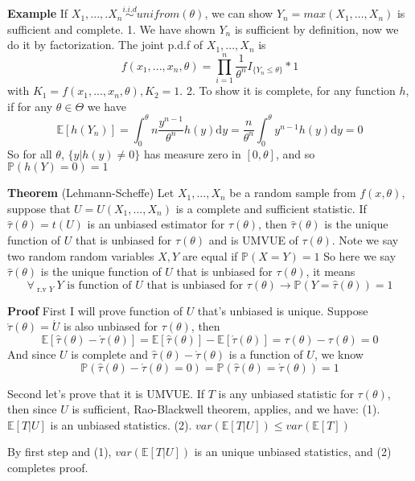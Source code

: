 \documentclass[a4paper,12pt]{article}
\begin{document}
\textbf{Example} If $X_1, ..., .X_n \overset{i.i.d}{\sim} unifrom(\theta)$, we can show $Y_n = max(X_1, ..., X_n)$ is sufficient and complete. 
1. We have shown $Y_n$ is sufficient by definition, now we do it by factorization. The joint p.d.f of $X_1, ..., X_n$ is
$$f(x_1, ..., x_n, \theta) = \prod_{i=1}^n \frac{1}{\theta^n} I_{\{Y_n \leq \theta\}} * 1$$
with $K_1 = f(x_1, ..., x_n, \theta), K_2 = 1$.
2. To show it is complete, for any function $h$, if for any $\theta\in\Theta$ we have
$$\mathbb{E}[ h(Y_n) ] = \int_0^\theta n\frac{y^{n-1}}{\theta^n}h(y) \mathrm{d}y = \frac{n}{\theta^n} \int_0^\theta y^{n-1}h(y) \mathrm{d}y = 0$$
So for all $\theta$, $\{ y | h(y) \neq 0 \}$ has measure zero in $[0, \theta]$, and so $\mathbb{P}( h(Y) = 0 ) = 1$ 

\textbf{Theorem} (Lehmann-Scheffe) Let $X_1, ..., X_n$ be a random sample from $f(x, \theta)$, suppose that $U = U(X_1, ..., X_n)$ is a complete and sufficient statistic. If $\hat{\tau}(\theta) = t(U)$ is an unbiased estimator for $\tau(\theta)$, then $\hat{\tau}(\theta)$ is the unique function of $U$ that is unbiased for $\tau(\theta)$ and is UMVUE of $\tau(\theta)$. Note we say two random random variables $X, Y$ are equal if $\mathbb{P}( X = Y ) = 1$ So here we say $\hat{\tau}(\theta)$ is the unique function of $U$ that is unbiased for $\tau(\theta)$, it means
$$\forall_{\text{ r.v } Y } \ Y \text{ is function of } U \text{ that is unbiased for } \tau(\theta) \to \mathbb{P}(Y = \hat{\tau}(\theta)) = 1$$ 

\textbf{Proof} 
First I will prove function of $U$ that's unbiased is unique. Suppose $\acute{\tau}(\theta) = \acute{U}$ is also unbiased for $\tau(\theta)$, then
$$\mathbb{E}[ \hat{\tau}(\theta) - \acute{\tau}(\theta) ] = \mathbb{E}[ \hat{\tau}(\theta) ] - \mathbb{E}[ \acute{\tau}(\theta) ] = \tau(\theta) - \tau(\theta) = 0$$
And since $U$ is complete and $\hat{\tau}(\theta) - \acute{\tau}(\theta)$ is a function of $U$, we know 
$$\mathbb{P}( \hat{\tau}(\theta) - \acute{\tau}(\theta) = 0 ) = \mathbb{P}( \hat{\tau}(\theta) = \acute{\tau}(\theta) ) = 1$$

Second let's prove that it is UMVUE. If $T$ is any unbiased statistic for $\tau(\theta)$, then since $U$ is sufficient, Rao-Blackwell theorem, applies, and we have: 
(1). $\mathbb{E}[ T | U ]$ is an unbiased statistics. 
(2). $var( \mathbb{E}[ T | U ] ) \leq var( \mathbb{E}[ T ] )$ 

By first step and (1), $var( \mathbb{E}[ T | U ] )$ is an unique unbiased statistics, and (2) completes proof.
\end{document}
